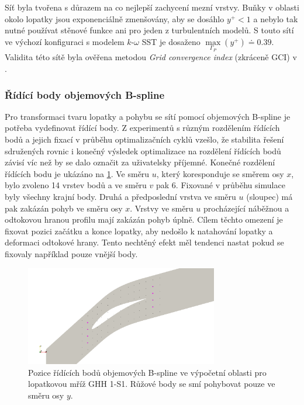Síť byla tvořena s důrazem na co nejlepší zachycení mezní vrstvy. Buňky v oblasti okolo lopatky jsou exponenciálně zmenšovány, aby se dosáhlo $ y^+ < 1 $ a nebylo tak nutné používat stěnové funkce ani pro jeden z turbulentních modelů.
S touto sítí ve výchozí konfiguraci s modelem $k\text{-}\omega$ SST je dosaženo $ \max\limits_{\Gamma_P}(y^+) \doteq 0.39 $. Validita této sítě byla ověřena metodou \textit{Grid convergence index} (zkráceně GCI) v \cite{tater2021mesh}.


\subsubsection{Řídící body objemových B-spline}
Pro transformaci tvaru lopatky a pohybu se sítí pomocí objemových B-spline je potřeba vydefinovat řídící body. Z experimentů s různým rozdělením řídících bodů a jejich fixací v průběhu optimalizačních cyklů vzešlo, že stabilita řešení sdružených rovnic i konečný výsledek optimalizace na rozdělení řídících bodů závisí víc než by se dalo označit za uživatelsky příjemné. Konečné rozdělení řídících bodu je ukázáno na \ref{fig:ghs1_cps}. Ve směru $ u $, který koresponduje se směrem osy $ x $, bylo zvoleno 14 vrstev bodů a ve směru $ v $ pak 6. Fixované v průběhu simulace byly všechny krajní body. Druhá a předposlední vrstva ve směru $ u $ (sloupec) má pak zakázán pohyb ve směru osy $ x $. Vrstvy ve směru $ u $ procházející náběžnou a odtokovou hranou profilu mají zakázán pohyb úplně. Cílem těchto omezení je fixovat pozici začátku a konce lopatky, aby nedošlo k natahování lopatky a deformaci odtokové hrany. Tento nechtěný efekt měl tendenci nastat pokud se fixovaly například pouze vnější body.

\begin{figure}
	\includegraphics[width=0.75\textwidth]{img/cps.png}
	\caption[Pozice řídících bodů]{Pozice řídících bodů objemových B-spline ve výpočetní oblasti pro lopatkovou mříž GHH 1-S1. Růžové body se smí pohybovat pouze ve směru osy $ y $.}
	\label{fig:ghs1_cps}
\end{figure}


